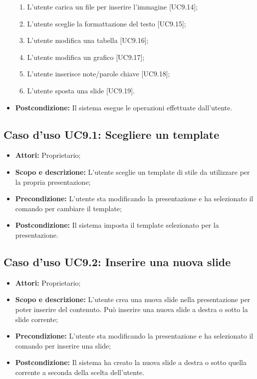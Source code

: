 \begin{itemize}
\begin{enumerate}
		\item L'utente carica un file per inserire l'immagine [UC9.14];

		\item L'utente sceglie la formattazione del testo [UC9.15];

		\item L'utente modifica una tabella [UC9.16];

		\item L'utente modifica un grafico [UC9.17];
		
		\item L'utente inserisce note/parole chiave [UC9.18];
		
		\item L'utente sposta una \gls{slide} [UC9.19].
	\end{enumerate}
	\item \textbf{Postcondizione:} Il sistema esegue le operazioni effettuate dall'utente.
\end{itemize}


\subsection{Caso d'uso UC9.1: Scegliere un \gls{template}}
\begin{itemize}
	\item \textbf{Attori:} Proprietario;
	\item \textbf{Scopo e descrizione:} L'utente sceglie un \gls{template} di stile da utilizzare per la propria presentazione;
	\item \textbf{Precondizione:} L'utente sta modificando la presentazione e ha selezionato il comando per cambiare il template;
	\item \textbf{Postcondizione:} Il sistema imposta il \gls{template} selezionato per la presentazione.
\end{itemize}


\subsection{Caso d'uso UC9.2: Inserire una nuova \gls{slide}}
\begin{itemize}
	\item \textbf{Attori:} Proprietario;
	\item \textbf{Scopo e descrizione:} L'utente crea una nuova \gls{slide} nella presentazione per poter inserire del contenuto. Può inserire una nuova slide a destra o sotto la slide corrente;
	\item \textbf{Precondizione:} L'utente sta modificando la presentazione e ha selezionato il comando per inserire una \gls{slide};
	\item \textbf{Postcondizione:} Il sistema ha creato la nuova \gls{slide} a destra o sotto quella corrente a seconda della scelta dell'utente.
\end{itemize}


